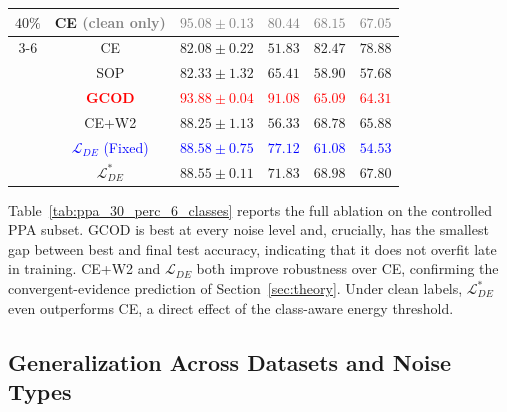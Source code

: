\documentclass{article}
\theoremstyle{definition}
\newcommand{\method}{GCOD}
\begin{document}
\begin{table}[t]
{\begin{tabular}{cccccc}
\midrule
\multirow{7}{*}{$40\%$}
 & CE \textcolor{gray}{(clean only)} & \textcolor{gray}{$95.08\pm0.13$} & \textcolor{gray}{$80.44$} & \textcolor{gray}{$68.15$} & \textcolor{gray}{$67.05$}\\
\cmidrule(l){3-6}
 & CE & $82.08\pm0.22$ & $51.83$ & $82.47$ & $78.88$\\
 & SOP & $82.33\pm1.32$ & $65.41$ & $58.90$ & $57.68$\\
 & \textcolor{red}{\textbf{\method{}}} & \textcolor{red}{\textbf{$93.88\pm0.04$}} & \textcolor{red}{\textbf{$91.08$}} & \textcolor{red}{$65.09$} & \textcolor{red}{$64.31$}\\
 & CE+W2 & $88.25\pm1.13$ & $56.33$ & $68.78$ & $65.88$\\
 & \textcolor{blue}{$\mathcal{L}_{DE}$ (Fixed)} & \textcolor{blue}{$88.58\pm0.75$} & \textcolor{blue}{$77.12$} & \textcolor{blue}{$61.08$} & \textcolor{blue}{$54.53$}\\
 & $\mathcal{L}_{DE}^{*}$ & $88.55\pm0.11$ & $71.83$ & $68.98$ & $67.80$\\
\bottomrule
\end{tabular}}
\end{table}

Table~\ref{tab:ppa_30_perc_6_classes} reports the full ablation on the controlled PPA subset. \method{} is best at every noise level and, crucially, has the smallest gap between best and final test accuracy, indicating that it does not overfit late in training. CE+W2 and $\mathcal{L}_{DE}$ both improve robustness over CE, confirming the convergent-evidence prediction of Section~\ref{sec:theory}. Under clean labels, $\mathcal{L}_{DE}^*$ even outperforms CE, a direct effect of the class-aware energy threshold.

\subsection{Generalization Across Datasets and Noise Types}
\end{document}
